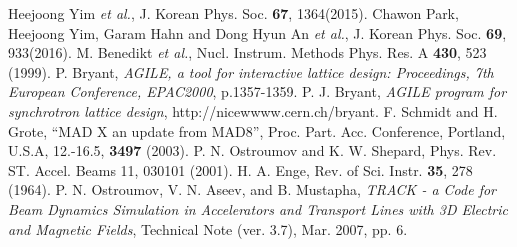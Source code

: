 \documentclass[jkps,preprint,fleqn,showpacs,showkeys]{revtex4}
\begin{document}
\begin{references}
 Heejoong Yim {\it et al.}, J. Korean Phys. Soc. {\bf 67}, 1364(2015).
 Chawon Park, Heejoong Yim, Garam Hahn and Dong Hyun An {\it et al.}, J. Korean Phys. Soc. {\bf 69}, 933(2016).   
 M. Benedikt {\it et al.}, Nucl. Instrum. Methods Phys. Res. A {\bf 430}, 523 (1999). 
 P. Bryant, {\it AGILE, a tool for interactive lattice design: Proceedings, 7th European Conference, EPAC2000}, p.1357-1359.
 P. J. Bryant, {\it AGILE program for synchrotron lattice design}, http://nicewwww.cern.ch/bryant.  
 F. Schmidt and H. Grote, ``MAD X an update from MAD8'', Proc. Part. Acc. Conference, Portland, U.S.A, 12.-16.5, {\bf 3497} (2003).  
 P. N. Ostroumov and K. W. Shepard, Phys. Rev. ST. Accel. Beams 11, 030101 (2001).
 H. A. Enge, Rev. of Sci. Instr. {\bf 35}, 278 (1964).  
 P. N. Ostroumov, V. N. Aseev, and B. Mustapha, {\it TRACK - a Code for Beam Dynamics Simulation in Accelerators and Transport Lines with 3D Electric and Magnetic Fields}, Technical Note (ver. 3.7), Mar. 2007, pp. 6.  
\end{references}
\end{document}
